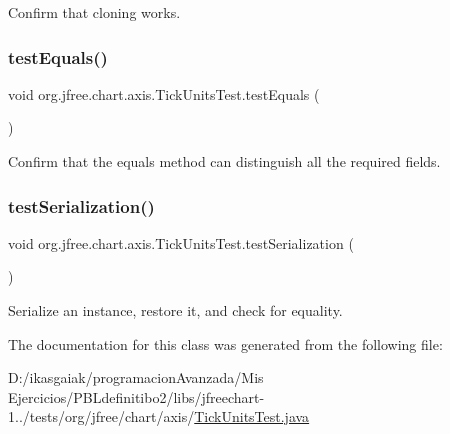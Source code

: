 Confirm that cloning works. \mbox{\label{classorg_1_1jfree_1_1chart_1_1axis_1_1_tick_units_test_ac1366dd8eefdad4f330eb42c1216ab7e}} 
\subsubsection{\texorpdfstring{test\+Equals()}{testEquals()}}
{\footnotesize\ttfamily void org.\+jfree.\+chart.\+axis.\+Tick\+Units\+Test.\+test\+Equals (\begin{DoxyParamCaption}{ }\end{DoxyParamCaption})}

Confirm that the equals method can distinguish all the required fields. \mbox{\label{classorg_1_1jfree_1_1chart_1_1axis_1_1_tick_units_test_a8a9fa7497269ec01bad15eed2f57df0f}} 
\subsubsection{\texorpdfstring{test\+Serialization()}{testSerialization()}}
{\footnotesize\ttfamily void org.\+jfree.\+chart.\+axis.\+Tick\+Units\+Test.\+test\+Serialization (\begin{DoxyParamCaption}{ }\end{DoxyParamCaption})}

Serialize an instance, restore it, and check for equality. 

The documentation for this class was generated from the following file\+:\begin{DoxyCompactItemize}
\item 
D\+:/ikasgaiak/programacion\+Avanzada/\+Mis Ejercicios/\+P\+B\+Ldefinitibo2/libs/jfreechart-\/1../tests/org/jfree/chart/axis/\mbox{\hyperlink{_tick_units_test_8java}{Tick\+Units\+Test.\+java}}\end{DoxyCompactItemize}
